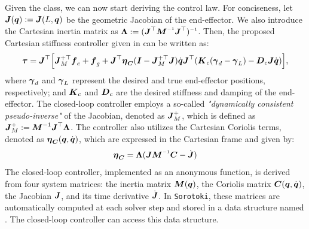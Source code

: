 Given the  class, we can now start deriving the control law. For conciseness, let ${\boldsymbol{J}}({\boldsymbol{q}}) := {\boldsymbol{J}}(L,{\boldsymbol{q}})$ be the geometric Jacobian of the end-effector. We also introduce the Cartesian inertia matrix as $\LambdaB := (\JB^\top \MB \inv \JB^\top)\inv$. Then, the proposed Cartesian stiffness controller given in \cite{DellaSantina2020a} can be written as:
%
\begin{multline}
    \boldsymbol{\tau} = {\boldsymbol{J}}^\top \Big[{\boldsymbol{J}}_M^{+\top} {\boldsymbol{f}}_{e} + {\boldsymbol{f}}_{g} + {\boldsymbol{J}}^\top {\boldsymbol{\eta}}_{{\boldsymbol{C}}}({\boldsymbol{I}} - {\boldsymbol{J}}_M^{+\top}{\boldsymbol{J}}){\dot{\boldsymbol{q}}}  {\boldsymbol{J}}^\top({\boldsymbol{K}}_{c} ({\boldsymbol{\gamma}}_d - {\boldsymbol{\gamma}}_L) - {\boldsymbol{D}}_c {\boldsymbol{J}} {\dot{\boldsymbol{q}}}) \Big ],
    \label{eq:C5:dellasantina_controller}
\end{multline}
%
where ${\boldsymbol{\gamma}}_d$ and ${\boldsymbol{\gamma}}_L$ represent the desired and true end-effector positions, respectively; and ${\boldsymbol{K}}_c$ and ${\boldsymbol{D}}_c$ are the desired stiffness and damping of the end-effector. The closed-loop controller employs a so-called \textit{"dynamically consistent pseudo-inverse"} of the Jacobian, denoted as ${\boldsymbol{J}}_M^{+}$, which is defined as ${\boldsymbol{J}}_M^{+} := {\boldsymbol{M}}^{-1} {\boldsymbol{J}}^\top \boldsymbol{\Lambda}$. The controller also utilizes the Cartesian Coriolis terms, denoted as ${\boldsymbol{\eta}}_{{\boldsymbol{C}}}({\boldsymbol{q}},{\dot{\boldsymbol{q}}})$, which are expressed in the Cartesian frame and given by:
%
\begin{equation}
    \etaB_{\CB} = \LambdaB (\JB \MB\inv \CB - \dot{\JB})
\end{equation}
%
The closed-loop controller, implemented as an anonymous function, is derived from four system matrices: the inertia matrix ${\boldsymbol{M}}({\boldsymbol{q}})$, the Coriolis matrix ${\boldsymbol{C}}({\boldsymbol{q}},{\dot{\boldsymbol{q}}})$, the Jacobian ${\boldsymbol{J}}$, and its time derivative $\dot{{\boldsymbol{J}}}$. In \texttt{Sorotoki}, these matrices are automatically computed at each solver step and stored in a data structure named . The closed-loop controller can access this data structure. %


    


